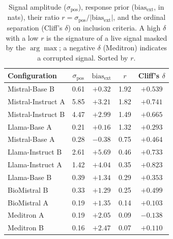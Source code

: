 \begin{table}[htbp]
    \centering
    \caption{Signal amplitude ($\sigma_{\text{pos}}$), response prior 
        ($\text{bias}_{\text{ext}}$, in nats), their ratio 
        $r = \sigma_{\text{pos}} / |\text{bias}_{\text{ext}}|$, and the 
        ordinal separation (Cliff's $\delta$) on inclusion criteria. A 
        high $\delta$ with a low $r$ is the signature of a live signal 
        masked by the $\arg\max$; a negative $\delta$ (Meditron) indicates 
        a corrupted signal. Sorted by $r$.}
    \label{tab:app-mechanism}
    \small
    \begin{tabular}{@{}lcccc@{}}
        \toprule
        \textbf{Configuration} & 
        \boldmath$\sigma_{\text{pos}}$ & 
        \boldmath$\text{bias}_{\text{ext}}$ & 
        \boldmath$r$ & 
        \textbf{Cliff's $\delta$} \\
        \midrule
        Mistral-Base B     & 0.61 & $+0.32$ & 1.92 & $+0.539$ \\
        Mistral-Instruct A & 5.85 & $+3.21$ & 1.82 & $+0.741$ \\
        Mistral-Instruct B & 4.47 & $+2.99$ & 1.49 & $+0.665$ \\
        Llama-Base A       & 0.21 & $+0.16$ & 1.32 & $+0.293$ \\
        Mistral-Base A     & 0.28 & $-0.38$ & 0.75 & $+0.464$ \\
        Llama-Instruct B   & 2.61 & $+5.69$ & 0.46 & $+0.733$ \\
        Llama-Instruct A   & 1.42 & $+4.04$ & 0.35 & $+0.823$ \\
        Llama-Base B       & 0.39 & $+1.34$ & 0.29 & $+0.353$ \\
        BioMistral B       & 0.33 & $+1.29$ & 0.25 & $+0.499$ \\
        BioMistral A       & 0.19 & $+1.35$ & 0.14 & $+0.103$ \\
        Meditron A         & 0.19 & $+2.05$ & 0.09 & $-0.138$ \\
        Meditron B         & 0.16 & $+2.47$ & 0.07 & $+0.110$ \\
        \bottomrule
    \end{tabular}
\end{table}

